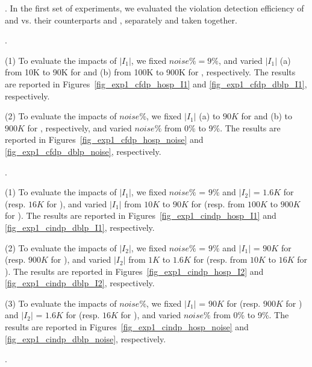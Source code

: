 
. In the first set of experiments, we evaluated the violation detection efficiency of  \pCFDs and \pCINDs vs. their counterparts \pCFDs and \pCINDs, separately and taken together.


.

\ni(1) To evaluate the impacts of $|I_1|$, we fixed $noise\% = 9\%$, and varied $|I_1|$ (a) from  10K to 90K for \hosp and (b) from 100K to 900K for \dblp, respectively. The results are reported in Figures~\ref{fig_exp1_cfdp_hosp_I1} and \ref{fig_exp1_cfdp_dblp_I1}, respectively.


\ni(2) To evaluate the impacts of $noise\%$, we fixed $|I_1|$ (a) to  $90K$ for \hosp and (b) to $900K$ for \dblp, respectively, and varied  $noise\%$ from 0\% to 9\%. The results are reported in Figures~\ref{fig_exp1_cfdp_hosp_noise} and \ref{fig_exp1_cfdp_dblp_noise}, respectively.



.


\ni(1) To evaluate the impacts of $|I_1|$, we fixed $noise\%$ = $9\%$ and $|I_2|$ = $1.6K$ for \hosp (resp. $16K$ for \dblp), and varied $|I_1|$ from  $10K$ to $90K$ for \hosp (resp. from $100K$ to $900K$ for \dblp). The results are reported in Figures~\ref{fig_exp1_cindp_hosp_I1} and \ref{fig_exp1_cindp_dblp_I1}, respectively.

\ni(2) To evaluate the impacts of $|I_2|$, we fixed $noise\%$ = $9\%$ and $|I_1|$ = $90K$ for \hosp (resp. $900K$ for \dblp), and varied $|I_2|$ from  $1K$ to $1.6K$ for \hosp (resp. from $10K$ to $16K$ for \dblp). The results are reported in Figures~\ref{fig_exp1_cindp_hosp_I2} and \ref{fig_exp1_cindp_dblp_I2}, respectively.


\ni(3) To evaluate the impacts of $noise\%$, we fixed $|I_1|$ = $90K$ for \hosp (resp. $900K$ for \dblp) and $|I_2|$ = $1.6K$ for \hosp (resp. $16K$ for \dblp), and varied  $noise\%$ from 0\% to 9\%. The results are reported in Figures~\ref{fig_exp1_cindp_hosp_noise} and \ref{fig_exp1_cindp_dblp_noise}, respectively.





.


